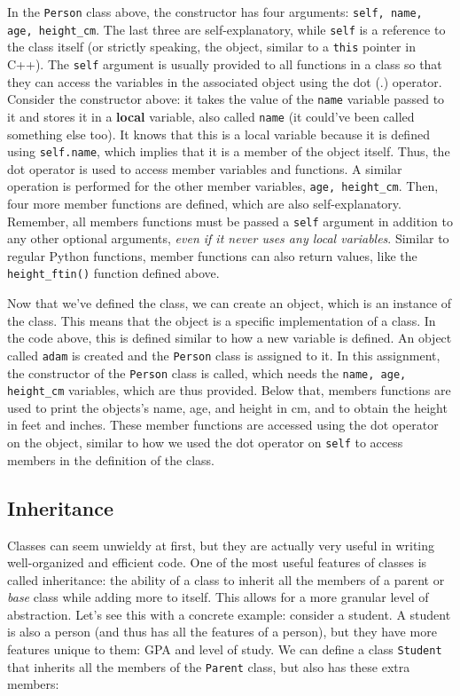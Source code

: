 \documentclass[12pt]{article}
\newcommand{\code}{\texttt}
\begin{document}
In the \code{Person} class above, the constructor has four arguments: \code{self, name, age, height\_cm}. The last three are self-explanatory, while \code{self} is a reference to the class itself (or strictly speaking, the object, similar to a \code{this} pointer in C++). The \code{self} argument is usually provided to all functions in a class so that they can access the variables in the associated object using the dot (.) operator. Consider the constructor above: it takes the value of the \code{name} variable passed to it and stores it in a \textbf{local} variable, also called \code{name} (it could've been called something else too). It knows that this is a local variable because it is defined using \code{self.name}, which implies that it is a member of the object itself. Thus, the dot operator is used to access member variables and functions. A similar operation is performed for the other member variables, \code{age, height\_cm}. Then, four more member functions are defined, which are also self-explanatory. Remember, all members functions must be passed a \code{self} argument in addition to any other optional arguments, \textit{even if it never uses any local variables}. Similar to regular Python functions, member functions can also return values, like the \code{height\_ftin()} function defined above.

Now that we've defined the class, we can create an object, which is an instance of the class. This means that the object is a specific implementation of a class. In the code above, this is defined similar to how a new variable is defined. An object called \code{adam} is created and the \code{Person} class is assigned to it. In this assignment, the constructor of the \code{Person} class is called, which needs the \code{name, age, height\_cm} variables, which are thus provided. Below that, members functions are used to print the objects's name, age, and height in cm, and to obtain the height in feet and inches. These member functions are accessed using the dot operator on the object, similar to how we used the dot operator on \code{self} to access members in the definition of the class.

\subsection{Inheritance}
Classes can seem unwieldy at first, but they are actually very useful in writing well-organized and efficient code. One of the most useful features of classes is called inheritance: the ability of a class to inherit all the members of a parent or \textit{base} class while adding more to itself. This allows for a more granular level of abstraction. Let's see this with a concrete example: consider a student. A student is also a person (and thus has all the features of a person), but they have more features unique to them: GPA and level of study. We can define a class \code{Student} that inherits all the members of the \code{Parent} class, but also has these extra members:
\end{document}
